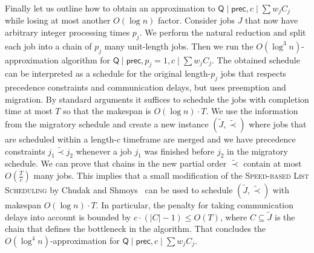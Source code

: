   Finally let us outline how to obtain an approximation to   $\mathsf{Q} \mid \mathsf{prec}, c \mid \sum w_jC_j$
  while losing at most another  $O(\log n)$ factor. Consider jobs $J$ that now have arbitrary integer processing times $p_j$. We perform the natural reduction and split each job into a chain of $p_j$ many unit-length jobs. 
  Then we run the $O(\log^3 n)$-approximation algorithm for $\mathsf{Q} \mid \mathsf{prec}, p_j=1, c \mid \sum w_jC_j$.
  The obtained schedule can be interpreted as a schedule for the original length-$p_j$ jobs that respects precedence constraints and communication delays, but uses preemption and migration. By standard arguments it suffices to schedule the jobs with completion time at most $T$ so that the makespan is $O(\log n) \cdot T$. We use the information from the migratory schedule and create a new instance $(\tilde{J},\tilde{\prec})$ where jobs that are scheduled within a length-$c$ timeframe are merged and we have precedence constraints $j_1 \tilde{\prec} j_2$ whenever a job $j_1$ was finished before $j_2$ in the migratory schedule. 
  We can prove that chains in the new partial order $\tilde{\prec}$ contain at most $O(\frac{T}{c})$ many jobs. This implies that a small modification of the \textsc{Speed-based List Scheduling} by Chudak and Shmoys~\cite{UniformlyRelatedMachinesWithPrecedences-ChudakShmoys-JALG99} can be used to schedule $(\tilde{J},\tilde{\prec})$ with makespan $O(\log n) \cdot T$. In particular, the penalty for taking communication delays into account is bounded by $c \cdot (|C|-1) \leq O(T)$, where $C \subseteq \tilde{J}$ is the chain that defines the bottleneck in the algorithm. That concludes the $O(\log^4 n)$-approximation for
    $\mathsf{Q} \mid \mathsf{prec},  c \mid \sum w_jC_j$.
  
